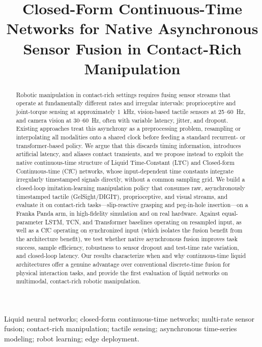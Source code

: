 \documentclass[conference]{IEEEtran}
\title{Closed-Form Continuous-Time Networks for Native Asynchronous Sensor Fusion in Contact-Rich Manipulation}
\author{\IEEEauthorblockN{Nahul Alaguraj}
\IEEEauthorblockA{\textit{Robotic Perception Course, Digital Assignment}}
\and
\IEEEauthorblockN{Akhilesh Manchi}
\IEEEauthorblockA{\textit{Robotic Perception Course, Digital Assignment}}
\and
\IEEEauthorblockN{Hanish Vigneshwar}
\IEEEauthorblockA{\textit{Robotic Perception Course, Digital Assignment}}
}
\begin{document}
\maketitle

\begin{abstract}
Robotic manipulation in contact-rich settings requires fusing sensor streams that operate at fundamentally different rates and irregular intervals: proprioceptive and joint-torque sensing at approximately 1~kHz, vision-based tactile sensors at 25--60~Hz, and camera vision at 30--60~Hz, often with variable latency, jitter, and dropout. Existing approaches treat this asynchrony as a preprocessing problem, resampling or interpolating all modalities onto a shared clock before feeding a standard recurrent- or transformer-based policy. We argue that this discards timing information, introduces artificial latency, and aliases contact transients, and we propose instead to exploit the native continuous-time structure of Liquid Time-Constant (LTC) and Closed-form Continuous-time (CfC) networks, whose input-dependent time constants integrate irregularly timestamped signals directly, without a common sampling grid. We build a closed-loop imitation-learning manipulation policy that consumes raw, asynchronously timestamped tactile (GelSight/DIGIT), proprioceptive, and visual streams, and evaluate it on contact-rich tasks---slip-reactive grasping and peg-in-hole insertion---on a Franka Panda arm, in high-fidelity simulation and on real hardware. Against equal-parameter LSTM, TCN, and Transformer baselines operating on resampled input, as well as a CfC operating on synchronized input (which isolates the fusion benefit from the architecture benefit), we test whether native asynchronous fusion improves task success, sample efficiency, robustness to sensor dropout and test-time rate variation, and closed-loop latency. Our results characterize when and why continuous-time liquid architectures offer a genuine advantage over conventional discrete-time fusion for physical interaction tasks, and provide the first evaluation of liquid networks on multimodal, contact-rich robotic manipulation.
\end{abstract}

\begin{IEEEkeywords}
Liquid neural networks; closed-form continuous-time networks; multi-rate sensor fusion; contact-rich manipulation; tactile sensing; asynchronous time-series modeling; robot learning; edge deployment.
\end{IEEEkeywords}
\end{document}
